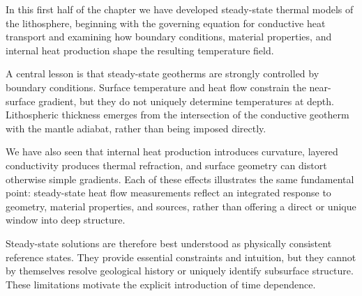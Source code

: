 In this first half of the chapter we have developed steady-state thermal models of the lithosphere, beginning with the governing equation for conductive heat transport and examining how boundary conditions, material properties, and internal heat production shape the resulting temperature field.

A central lesson is that steady-state geotherms are strongly controlled by boundary conditions. Surface temperature and heat flow constrain the near-surface gradient, but they do not uniquely determine temperatures at depth. Lithospheric thickness emerges from the intersection of the conductive geotherm with the mantle adiabat, rather than being imposed directly.

We have also seen that internal heat production introduces curvature, layered conductivity produces thermal refraction, and surface geometry can distort otherwise simple gradients. Each of these effects illustrates the same fundamental point: steady-state heat flow measurements reflect an integrated response to geometry, material properties, and sources, rather than offering a direct or unique window into deep structure.

Steady-state solutions are therefore best understood as physically consistent reference states. They provide essential constraints and intuition, but they cannot by themselves resolve geological history or uniquely identify subsurface structure. These limitations motivate the explicit introduction of time dependence.

\clearpage
\nocite{Beardsmore&Cull2001}
\nocite{Carslaw&Jaeger1986}
\nocite{Fowler1990}
\nocite{Jaupart&Mareschal2011}
\nocite{Lowrie1997}



